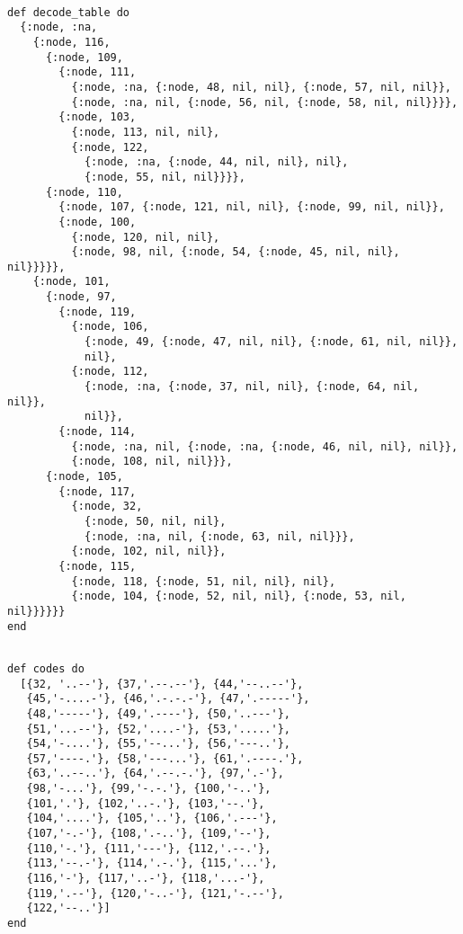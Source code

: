 \documentclass[a4paper,11pt]{article}
\begin{document}
\begin{verbatim}

def decode_table do
  {:node, :na,
    {:node, 116,
      {:node, 109,
        {:node, 111,
          {:node, :na, {:node, 48, nil, nil}, {:node, 57, nil, nil}},
          {:node, :na, nil, {:node, 56, nil, {:node, 58, nil, nil}}}},
        {:node, 103,
          {:node, 113, nil, nil},
          {:node, 122,
            {:node, :na, {:node, 44, nil, nil}, nil},
            {:node, 55, nil, nil}}}},
      {:node, 110,
        {:node, 107, {:node, 121, nil, nil}, {:node, 99, nil, nil}},
        {:node, 100,
          {:node, 120, nil, nil},
          {:node, 98, nil, {:node, 54, {:node, 45, nil, nil}, nil}}}}},
    {:node, 101,
      {:node, 97,
        {:node, 119,
          {:node, 106,
            {:node, 49, {:node, 47, nil, nil}, {:node, 61, nil, nil}},
            nil},
          {:node, 112,
            {:node, :na, {:node, 37, nil, nil}, {:node, 64, nil, nil}},
            nil}},
        {:node, 114,
          {:node, :na, nil, {:node, :na, {:node, 46, nil, nil}, nil}},
          {:node, 108, nil, nil}}},
      {:node, 105,
        {:node, 117,
          {:node, 32,
            {:node, 50, nil, nil},
            {:node, :na, nil, {:node, 63, nil, nil}}},
          {:node, 102, nil, nil}},
        {:node, 115,
          {:node, 118, {:node, 51, nil, nil}, nil},
          {:node, 104, {:node, 52, nil, nil}, {:node, 53, nil, nil}}}}}}
end
\end{verbatim}

\newpage
\begin{verbatim}

def codes do
  [{32, '..--'}, {37,'.--.--'}, {44,'--..--'},
   {45,'-....-'}, {46,'.-.-.-'}, {47,'.-----'},
   {48,'-----'}, {49,'.----'}, {50,'..---'},
   {51,'...--'}, {52,'....-'}, {53,'.....'},
   {54,'-....'}, {55,'--...'}, {56,'---..'},
   {57,'----.'}, {58,'---...'}, {61,'.----.'},
   {63,'..--..'}, {64,'.--.-.'}, {97,'.-'},
   {98,'-...'}, {99,'-.-.'}, {100,'-..'},
   {101,'.'}, {102,'..-.'}, {103,'--.'},
   {104,'....'}, {105,'..'}, {106,'.---'},
   {107,'-.-'}, {108,'.-..'}, {109,'--'},
   {110,'-.'}, {111,'---'}, {112,'.--.'},
   {113,'--.-'}, {114,'.-.'}, {115,'...'},
   {116,'-'}, {117,'..-'}, {118,'...-'},
   {119,'.--'}, {120,'-..-'}, {121,'-.--'},
   {122,'--..'}]
end
\end{verbatim}
\end{document}

